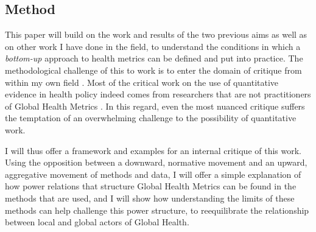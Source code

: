 


\subsection{Method}

This paper will build on the work and results of the two previous aims as well as on other work I have done in the field, to understand the conditions in which a \textsl{bottom-up} approach to health metrics can be defined and put into practice. The methodological challenge of this to work is to enter the domain of critique from within my own field \citep{latour_why_2004}. Most of the critical work on the use of quantitative evidence in health policy indeed comes from researchers that are not practitioners of Global Health Metrics \citep{merry_measuring_2011} . In this regard, even the most nuanced critique suffers the temptation of an overwhelming challenge to the possibility of quantitative work\citep{latour_why_2004}.

I will thus offer a framework and examples for an internal critique of this work. Using the opposition between a downward, normative movement and an upward, aggregative movement of methods and data, I will offer a simple explanation of how power relations that structure Global Health Metrics can be found in the methods that are used, and I will show how understanding the limits of these methods can help challenge this power structure, to reequilibrate the relationship between local and global actors of Global Health.

